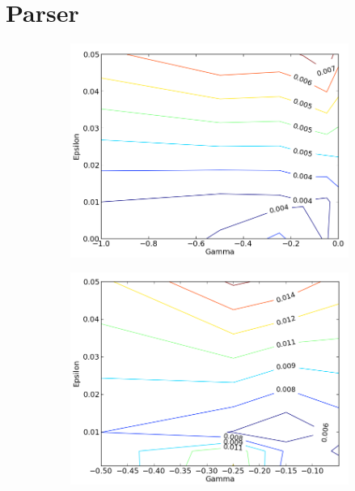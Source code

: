 \documentclass[12pt,notitlepage,twoside]{scrreprt}
\begin{document}
\section{Parser}
\label{sec:parser}
\begin{figure}[h!]
\centering
\begin{subfigure}[b]{.49\textwidth}
  \centering
  \includegraphics[width=\linewidth]{figs/fine_tune_tr_zoom.png}
  \caption{}
  \label{coarse}
\end{subfigure}
\begin{subfigure}[b]{.49\textwidth}
  \centering
  \includegraphics[width=\linewidth]{figs/fine_tune_ts.png}
  \caption{}
  \label{fine}
\end{subfigure}
\end{figure}
\end{document}
